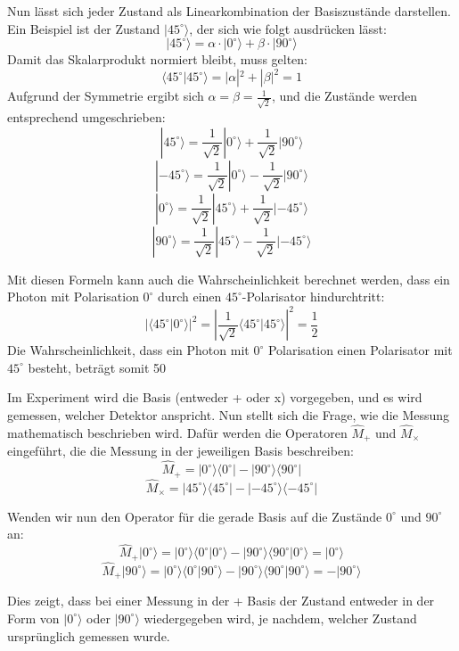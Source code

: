 Nun lässt sich jeder Zustand als Linearkombination der Basiszustände darstellen. Ein Beispiel ist der Zustand \(|45^\circ \rangle\), der sich wie folgt ausdrücken lässt:
\[
|45^\circ \rangle = \alpha \cdot |0^\circ \rangle + \beta \cdot |90^\circ \rangle
\]
Damit das Skalarprodukt normiert bleibt, muss gelten:
\[
\langle 45^\circ | 45^\circ \rangle = |\alpha|^2 + |\beta|^2 = 1
\]
Aufgrund der Symmetrie ergibt sich \(\alpha = \beta = \frac{1}{\sqrt{2}}\), und die Zustände werden entsprechend umgeschrieben:
\[
|45^\circ \rangle = \frac{1}{\sqrt{2}} |0^\circ \rangle + \frac{1}{\sqrt{2}} |90^\circ \rangle
\]
\[
|-45^\circ \rangle = \frac{1}{\sqrt{2}} |0^\circ \rangle - \frac{1}{\sqrt{2}} |90^\circ \rangle
\]
\[
|0^\circ \rangle = \frac{1}{\sqrt{2}} |45^\circ \rangle + \frac{1}{\sqrt{2}} |-45^\circ \rangle
\]
\[
|90^\circ \rangle = \frac{1}{\sqrt{2}} |45^\circ \rangle - \frac{1}{\sqrt{2}} |-45^\circ \rangle
\]

Mit diesen Formeln kann auch die Wahrscheinlichkeit berechnet werden, dass ein Photon mit Polarisation \(0^\circ\) durch einen \(45^\circ\)-Polarisator hindurchtritt:
\[
|\langle 45^\circ | 0^\circ \rangle |^2 = \left| \frac{1}{\sqrt{2}} \langle 45^\circ | 45^\circ \rangle \right|^2 = \frac{1}{2}
\]
Die Wahrscheinlichkeit, dass ein Photon mit \(0^\circ\) Polarisation einen Polarisator mit \(45^\circ\) besteht, beträgt somit 50%

Im Experiment wird die Basis (entweder + oder x) vorgegeben, und es wird gemessen, welcher Detektor anspricht. Nun stellt sich die Frage, wie die Messung mathematisch beschrieben wird. Dafür werden die Operatoren \(\hat{M}_+\) und \(\hat{M}_\times\) eingeführt, die die Messung in der jeweiligen Basis beschreiben:
\[
\hat{M}_+ = |0^\circ \rangle \langle 0^\circ | - |90^\circ \rangle \langle 90^\circ |
\]
\[
\hat{M}_\times = |45^\circ \rangle \langle 45^\circ | - |-45^\circ \rangle \langle -45^\circ |
\]

Wenden wir nun den Operator für die gerade Basis auf die Zustände \(0^\circ\) und \(90^\circ\) an:
\[
\hat{M}_+ |0^\circ \rangle = |0^\circ \rangle \langle 0^\circ | 0^\circ \rangle - |90^\circ \rangle \langle 90^\circ | 0^\circ \rangle = |0^\circ \rangle
\]
\[
\hat{M}_+ |90^\circ \rangle = |0^\circ \rangle \langle 0^\circ | 90^\circ \rangle - |90^\circ \rangle \langle 90^\circ | 90^\circ \rangle = -|90^\circ \rangle
\]

Dies zeigt, dass bei einer Messung in der + Basis der Zustand entweder in der Form von \(|0^\circ \rangle\) oder \(|90^\circ \rangle\) wiedergegeben wird, je nachdem, welcher Zustand ursprünglich gemessen wurde.

